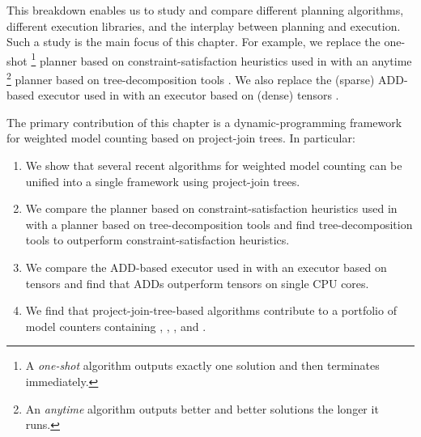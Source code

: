 This breakdown enables us to study and compare different planning algorithms, different execution libraries, and the interplay between planning and execution.
Such a study is the main focus of this chapter. 
For example, we replace the one-shot%
\footnote{A \emph{one-shot} algorithm outputs exactly one solution and then terminates immediately.}
planner based on constraint-satisfaction heuristics \cite{dechter03} used in \cite{DPV20} with an anytime%
\footnote{An \emph{anytime} algorithm outputs better and better solutions the longer it runs.} planner based on tree-decomposition tools \cite{MPPV04,AMW17,HS18,Tamaki17}.
We also replace the (sparse) ADD-based executor \cite{bahar1997algebraic} used in \cite{DPV20} with an executor based on (dense) tensors \cite{KKCLA17}.

The primary contribution of this chapter is a dynamic-programming framework for weighted model counting based on project-join trees.
In particular:
\begin{enumerate}
    \item We show that several recent algorithms for weighted model counting \cite{DPV20,fichte2020exploiting} can be unified into a single framework using project-join trees.
    \item We compare the planner based on constraint-satisfaction heuristics \cite{dechter03} used in \cite{DPV20} with a planner based on tree-decomposition tools \cite{robertson1984graph,AMW17,HS18,Tamaki17} and find tree-decomposition tools to outperform constraint-satisfaction heuristics.
    \item We compare the ADD-based executor \cite{bahar1997algebraic} used in \cite{DPV20} with an executor based on tensors \cite{KKCLA17} and find that ADDs outperform tensors on single CPU cores.
    \item We find that project-join-tree-based algorithms contribute to a portfolio of model counters containing \cachet{} \cite{sang2004combining}, \ctd{} \cite{darwiche2004new}, \df{} \cite{LM17}, and \minictd{} \cite{OD15}.
\end{enumerate}


